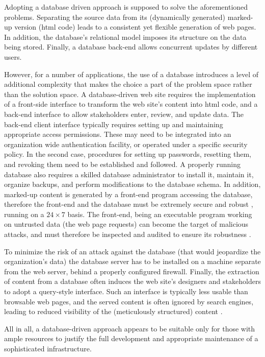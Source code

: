 \documentclass[10pt]{article}
\begin{document}
Adopting a database driven approach is supposed to
solve the aforementioned problems.
Separating the source data from its (dynamically generated)
marked-up version ({\sc html} code) leads to a consistent
yet flexible generation of web pages.
In addition, the database's relational model imposes
its structure on the data being stored.
Finally, a database back-end allows concurrent updates by
different users.

However, for a number of applications, the use of a database
introduces a level of additional complexity that
makes the choice a part of
the problem space rather than the solution space.
A database-driven web site requires the implementation of a
front-side interface to transform the web site's content into
{\sc html} code, and a back-end interface to allow stakeholders
enter, review, and update data.
The back-end client interface typically requires setting up
and maintaining appropriate access permissions.
These may need to be integrated into an organization wide authentication 
facility, or operated under a specific security policy.
In the second case, procedures for setting up passwords,
resetting them, and revoking them need to be established and followed.
A properly running database also requires a skilled database
administrator to install it, maintain it, organize backups,
and perform modifications to the database schema.
In addition, marked-up content is generated by a front-end
program accessing the database, therefore the front-end and the database
must be extremely secure and robust \cite{VG01}, running on a $24 \times 7$ basis.
The front-end, being an executable program working on
untrusted data (the web page requests) can become the target of
malicious attacks,
and must therefore be inspected and audited to ensure its robustness \cite{YHDM04}.

To minimize the risk of an attack against the database
(that would jeopardize the organization's data)
the database server has to be installed on a machine separate
from the web server, behind a properly configured firewall.
Finally, the extraction of content from a database often
induces the web site's designers and stakeholders to adopt a
query-style interface.
Such an interface is typically less usable than browsable web pages,
and the served content is often ignored by search engines,
leading to reduced visibility
of the (meticulously structured) content \cite{DEEP_WEB, JP04}.

All in all, a database-driven approach appears to be suitable
only for those with ample resources to justify the full
development and appropriate maintenance of a sophisticated infrastructure.
\end{document}
